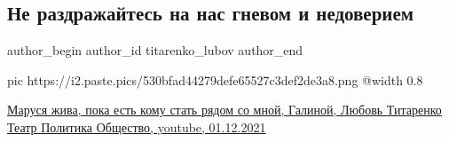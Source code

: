  
 
 
 
 
 
\subsection{Не раздражайтесь на нас гневом и недоверием}
\label{sec:01_12_2021.fb.titarenko_lubov.1.babushka_galja}
 
\ifcmt
 author_begin
   author_id titarenko_lubov
 author_end
\fi

\ifcmt
  pic https://i2.paste.pics/530bfad44279defe65527c3def2de3a8.png
  @width 0.8
\fi

\href{https://www.youtube.com/watch?app=desktop&v=ZRyTcvr_oAs}{%
Маруся жива, пока есть кому стать рядом со мной, Галиной, %
Любовь Титаренко Театр Политика Общество, youtube, 01.12.2021%
}

